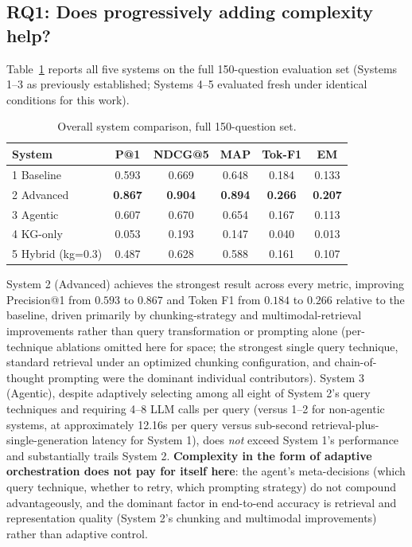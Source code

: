 \documentclass[sigconf,anonymous,review]{acmart}
\begin{document}
\subsection{RQ1: Does progressively adding complexity help?}

Table~\ref{tab:overall} reports all five systems on the full 150-question evaluation set (Systems 1--3 as previously established; Systems 4--5 evaluated fresh under identical conditions for this work).

\begin{table}[t]
\caption{Overall system comparison, full 150-question set.}
\label{tab:overall}
\begin{tabular}{lccccc}
\toprule
System & P@1 & NDCG@5 & MAP & Tok-F1 & EM \\
\midrule
1 Baseline           & 0.593 & 0.669 & 0.648 & 0.184 & 0.133 \\
2 Advanced           & \textbf{0.867} & \textbf{0.904} & \textbf{0.894} & \textbf{0.266} & \textbf{0.207} \\
3 Agentic            & 0.607 & 0.670 & 0.654 & 0.167 & 0.113 \\
4 KG-only            & 0.053 & 0.193 & 0.147 & 0.040 & 0.013 \\
5 Hybrid (kg=0.3)    & 0.487 & 0.628 & 0.588 & 0.161 & 0.107 \\
\bottomrule
\end{tabular}
\end{table}

System 2 (Advanced) achieves the strongest result across every metric, improving Precision@1 from $0.593$ to $0.867$ and Token F1 from $0.184$ to $0.266$ relative to the baseline, driven primarily by chunking-strategy and multimodal-retrieval improvements rather than query transformation or prompting alone (per-technique ablations omitted here for space; the strongest single query technique, standard retrieval under an optimized chunking configuration, and chain-of-thought prompting were the dominant individual contributors). System 3 (Agentic), despite adaptively selecting among all eight of System 2's query techniques and requiring 4--8 LLM calls per query (versus 1--2 for non-agentic systems, at approximately 12.16s per query versus sub-second retrieval-plus-single-generation latency for System 1), does \emph{not} exceed System 1's performance and substantially trails System 2. \textbf{Complexity in the form of adaptive orchestration does not pay for itself here}: the agent's meta-decisions (which query technique, whether to retry, which prompting strategy) do not compound advantageously, and the dominant factor in end-to-end accuracy is retrieval and representation quality (System 2's chunking and multimodal improvements) rather than adaptive control.
\end{document}

